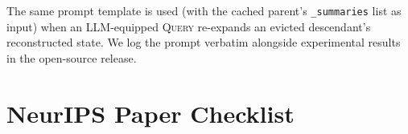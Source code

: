 \documentclass{article}
\begin{document}
The same prompt template is used (with the cached parent's
\texttt{\_summaries} list as input) when an LLM-equipped \textsc{Query}
re-expands an evicted descendant's reconstructed state.  We log the
prompt verbatim alongside experimental results in the open-source
release.

\newcommand{\answerYes}[1][]{\textcolor{blue}{[Yes]}~#1}
\newcommand{\answerNo}[1][]{\textcolor{orange}{[No]}~#1}
\newcommand{\answerNA}[1][]{\textcolor{gray}{[N/A]}~#1}

\section*{NeurIPS Paper Checklist}
\end{document}
